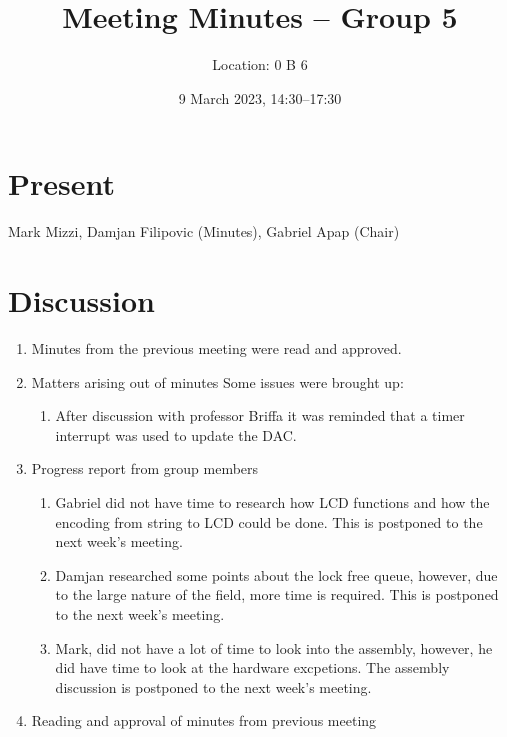 \documentclass[11pt,a4paper]{scrartcl}
\title{Meeting Minutes -- Group 5}
\author{Location: 0 B 6}
\date{9 March 2023, 14:30--17:30}
\begin{document}
\maketitle

\section*{Present}
Mark Mizzi,
Damjan Filipovic (Minutes),
Gabriel Apap    (Chair)

\section*{Discussion}

\begin{enumerate}


\item Minutes from the previous meeting were read and approved.

\item Matters arising out of minutes
    Some issues were brought up:
    \begin{enumerate}
        \item After discussion with professor Briffa it was reminded that a timer interrupt was used to update the DAC.
    \end{enumerate}

\item Progress report from group members
   \begin{enumerate}
        \item Gabriel did not have time to research how LCD functions and how the encoding from string to LCD could be done. This is postponed to the next week's meeting.
        \item Damjan researched some points about the lock free queue, however, due to the large nature of the field, more time is required. This is postponed to the next week's meeting.
        \item Mark, did not have a lot of time to look into the assembly, however, he did have time to look at the hardware excpetions. 
            The assembly discussion is postponed to the next week's meeting.
   \end{enumerate}


\item Reading and approval of minutes from previous meeting


\end{enumerate}
\end{document}
